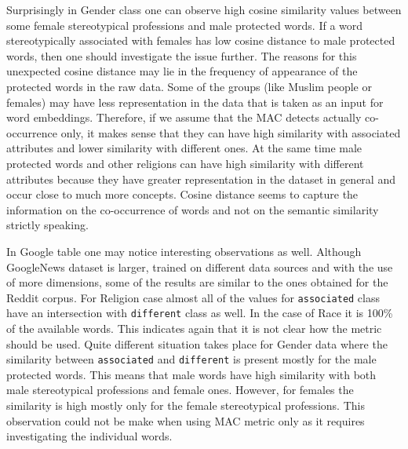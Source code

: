 \documentclass[12pt,]{book}
\begin{document}
Surprisingly in Gender class one can observe high cosine similarity
values between some female stereotypical professions and male protected
words. If a word stereotypically associated with females has low cosine
distance to male protected words, then one should investigate the issue
further. The reasons for this unexpected cosine distance may lie in the
frequency of appearance of the protected words in the raw data. Some of
the groups (like Muslim people or females) may have less representation
in the data that is taken as an input for word embeddings. Therefore, if
we assume that the MAC detects actually co-occurrence only, it makes
sense that they can have high similarity with associated attributes and
lower similarity with different ones. At the same time male protected
words and other religions can have high similarity with different
attributes because they have greater representation in the dataset in
general and occur close to much more concepts. Cosine distance seems to
capture the information on the co-occurrence of words and not on the
semantic similarity strictly speaking.

In Google table one may notice interesting observations as well.
Although GoogleNews dataset is larger, trained on different data sources
and with the use of more dimensions, some of the results are similar to
the ones obtained for the Reddit corpus. For Religion case almost all of
the values for \texttt{associated} class have an intersection with
\texttt{different} class as well. In the case of Race it is 100\% of the
available words. This indicates again that it is not clear how the
metric should be used. Quite different situation takes place for Gender
data where the similarity between \texttt{associated} and
\texttt{different} is present mostly for the male protected words. This
means that male words have high similarity with both male stereotypical
professions and female ones. However, for females the similarity is high
mostly only for the female stereotypical professions. This observation
could not be make when using MAC metric only as it requires
investigating the individual words.
\end{document}
